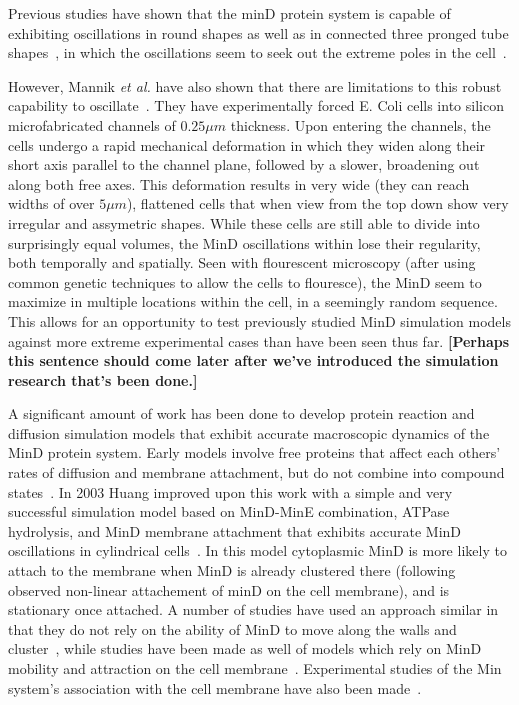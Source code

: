 \documentclass[letterpaper,twocolumn,amsmath,amssymb,pre]{revtex4-1}
\newcommand{\red}[1]{{\bf \color{red} #1}}
\newcommand{\fixme}[1]{\red{[#1]}}
\begin{document}
Previous studies have shown that the minD protein system is capable of
exhibiting oscillations in round shapes \cite{fange2006noise}as well
as in connected three pronged tube shapes~\cite{varma2008min}, in
which the oscillations seem to seek out the extreme poles in the
cell~\cite{corbin2002exploring,juarez2010changes}.

However, Mannik \emph{et al.} have also shown that there are
limitations to this robust capability to
oscillate~\cite{mannik2010bacteria,mannik2009bacterial}. They have
experimentally forced E. Coli cells into silicon microfabricated
channels of $0.25\mu m$ thickness. Upon entering the channels, the
cells undergo a rapid mechanical deformation in which they widen along
their short axis parallel to the channel plane, followed by a slower,
broadening out along both free axes.  This deformation results in very
wide (they can reach widths of over $5\mu m$), flattened cells that
when view from the top down show very irregular and assymetric shapes.
While these cells are still able to divide into surprisingly equal
volumes, the MinD oscillations within lose their regularity, both
temporally and spatially. Seen with flourescent microscopy (after
using common genetic techniques to allow the cells to flouresce), the
MinD seem to maximize in multiple locations within the cell, in a
seemingly random sequence. This allows for an opportunity to test
previously studied MinD simulation models against more extreme
experimental cases than have been seen thus far. \fixme{Perhaps this
  sentence should come later after we've introduced the simulation
  research that's been done.}

A significant amount of work has been done to develop protein reaction
and diffusion simulation models that exhibit accurate macroscopic
dynamics of the MinD protein system. Early models involve free
proteins that affect each others' rates of diffusion and membrane
attachment, but do not combine into compound
states~\cite{meinhardt2001pattern}.  In 2003 Huang improved upon this
work with a simple and very successful simulation model based on
MinD-MinE combination, ATPase hydrolysis, and MinD membrane attachment
that exhibits accurate MinD oscillations in cylindrical
cells~\cite{huang2003dynamic}. In this model cytoplasmic MinD is more
likely to attach to the membrane when MinD is already clustered there
(following observed non-linear attachement of minD on the cell
membrane), and is stationary once attached.  A number of studies have
used an approach similar in that they do not rely on the ability of
MinD to move along the walls and
cluster~\cite{kruse2007experimentalist, meinhardt2001pattern,
  drew2005polymerization, fange2006noise, kerr2006division}, while
studies have been made as well of models which rely on MinD mobility
and attraction on the cell membrane~\cite{kruse2002dynamic,
  howard2005cellular}.  Experimental studies of the Min system's
association with the cell membrane have also been
made~\cite{hsieh2010direct,mileykovskaya2003effects}.
\end{document}
